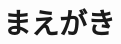 \documentclass[originalpaper]{jsaiart}     %
\author{%
 \name{金子}{純也}{Junya Kaneko}
 \affiliation{Morning Project Samurai 株式会社}%
     {Morning Project Samurai Inc.}%
     {junya@mpsamurai.com, http://www.mpsamurai.com}
\and
 \name{山田}{貢己}{Miki Yamada}
 \sameaffiliation{m.yamada@mpsamurai.com}
}
\begin{document}
\maketitle

\section{まえがき}

\end{document}
